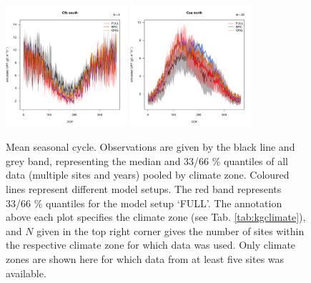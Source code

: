 \documentclass{myreport}
\begin{document}
\begin{figure}[!ht]
\includegraphics[width=0.4\textwidth]{fig/meandoy_byzone_Cfb_south_FULL.pdf}
\includegraphics[width=0.4\textwidth]{fig/meandoy_byzone_Csa_north_FULL.pdf}
    \caption{Mean seasonal cycle. Observations are given by the black line and grey band, representing the median and 33/66 \% quantiles of all data (multiple sites and years) pooled by climate zone. Coloured lines represent different model setups. The red band represents 33/66 \% quantiles for the model setup `FULL'. The annotation above each plot specifies the climate zone (see Tab. \ref{tab:kgclimate}), and $N$ given in the top right corner gives the number of sites within the respective climate zone for which data was used. Only climate zones are shown here for which data from at least five sites was available.}
    \label{fig:season}
\end{figure}
\end{document}
